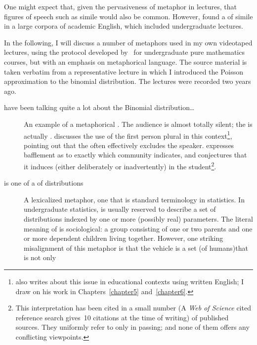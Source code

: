 One might expect that, given the pervasiveness of metaphor in
lectures, that figures of speech such as simile would also be common.
However,  found a 
of simile in a large corpora of academic English, which included
undergraduate lectures.

In the following, I will discuss a number of metaphors used in my own
videotaped lectures, using the protocol developed
by~ for undergraduate pure mathematics courses,
but with an emphasis on metaphorical language.  The source material is
taken verbatim from a representative lecture in which I introduced the
Poisson approximation to the binomial distribution.  The lectures were
recorded two years ago.

\begin{description}
\item[ have been talking quite a lot about the Binomial
  distribution\ldots]{An example of a metaphorical .  The
  audience is almost totally silent; the  is actually
  .   discusses the use of the first
  person plural in this context\footnote{\citeauthor{pimm1984} also
    writes about this issue in educational contexts using written
    English; I draw on his work in Chapters~\ref{chapter5}
    and~\ref{chapter6}.}, pointing out that the  often effectively excludes the speaker.  \citeauthor{pimm1984}
  expresses bafflement as to exactly which community 
  indicates, and conjectures that it induces (either deliberately or
  inadvertently)  in the
  student\footnote{This interpretation has been cited in a small
    number (A \emph{Web of Science} cited reference search gives~10
    citations at the time of writing) of published sources.  They
    uniformly refer to  only in passing; and none of
    them offers any conflicting viewpoints.}.} 
\item[ is one of a  of
  distributions]{A lexicalized metaphor, one that is standard
  terminology in statistics.  In undergraduate statistics,
   is usually reserved to describe a set of
  distributions indexed by one or more (possibly real) parameters.
  The literal meaning of  is sociological: a group
  consisting of one or two parents and one or more dependent children
  living together.  However, one striking misalignment of this
  metaphor is that the vehicle is a set (of humans)that is not only
}
\end{description}
